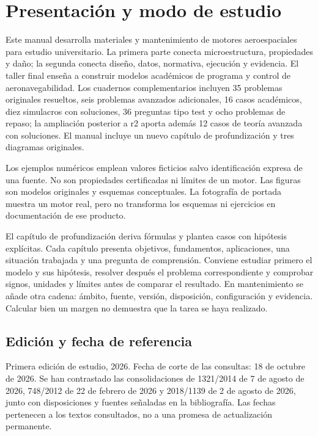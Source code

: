 \chapter*{Presentación y modo de estudio}
Este manual desarrolla materiales y mantenimiento de motores aeroespaciales para estudio universitario. La primera parte conecta microestructura, propiedades y daño; la segunda conecta diseño, datos, normativa, ejecución y evidencia. El taller final enseña a construir modelos académicos de programa y control de aeronavegabilidad. Los cuadernos complementarios incluyen 35 problemas originales resueltos, seis problemas avanzados adicionales, 16 casos académicos, diez simulacros con soluciones, 36 preguntas tipo test y ocho problemas de repaso; la ampliación posterior a r2 aporta además 12 casos de teoría avanzada con soluciones. El manual incluye un nuevo capítulo de profundización y tres diagramas originales.

Los ejemplos numéricos emplean valores ficticios salvo identificación expresa de una fuente. No son propiedades certificadas ni límites de un motor. Las figuras son modelos originales y esquemas conceptuales. La fotografía de portada muestra un motor real, pero no transforma los esquemas ni ejercicios en documentación de ese producto.

El capítulo de profundización deriva fórmulas y plantea casos con hipótesis explícitas. Cada capítulo presenta objetivos, fundamentos, aplicaciones, una situación trabajada y una pregunta de comprensión. Conviene estudiar primero el modelo y sus hipótesis, resolver después el problema correspondiente y comprobar signos, unidades y límites antes de comparar el resultado. En mantenimiento se añade otra cadena: ámbito, fuente, versión, disposición, configuración y evidencia. Calcular bien un margen no demuestra que la tarea se haya realizado.

\section*{Edición y fecha de referencia}
Primera edición de estudio, 2026. Fecha de corte de las consultas: 18 de octubre de 2026. Se han contrastado las consolidaciones de 1321/2014 de 7 de agosto de 2026, 748/2012 de 22 de febrero de 2026 y 2018/1139 de 2 de agosto de 2026, junto con disposiciones y fuentes señaladas en la bibliografía. Las fechas pertenecen a los textos consultados, no a una promesa de actualización permanente.

